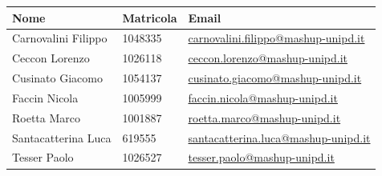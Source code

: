 \documentclass[10pt,a4paper,sans]{moderncv}        %
\begin{document}
	\begin{center}
		\begin{tabularx}{0.8\linewidth}{|X |X |l|}
		\hline
		\hspace*{0.2cm} \textbf{Nome} & \hspace*{0.2cm} \textbf{Matricola} & \hspace*{0.2cm} \textbf{Email} \\ \hline

		\hspace*{0.2cm} Carnovalini Filippo & \hspace*{0.2cm}1048335 & \hspace*{0.2cm}\href{mailto:carnovalini.filippo@mashup-unipd.it}{carnovalini.filippo@mashup-unipd.it} \\ \hline

		\hspace*{0.2cm} Ceccon Lorenzo & \hspace*{0.2cm}1026118 & \hspace*{0.2cm}\href{mailto:ceccon.lorenzo@mashup-unipd.it}{ceccon.lorenzo@mashup-unipd.it} \\ \hline

		\hspace*{0.2cm} Cusinato Giacomo &\hspace*{0.2cm}1054137 & \hspace*{0.2cm}\href{mailto:cusinato.giacomo@mashup-unipd.it}{cusinato.giacomo@mashup-unipd.it} \\ \hline
 
		\hspace*{0.2cm} Faccin Nicola &\hspace*{0.2cm}1005999  & \hspace*{0.2cm}\href{mailto:faccin.nicola@mashup-unipd.it}{faccin.nicola@mashup-unipd.it} \\ \hline

		\hspace*{0.2cm} Roetta Marco & \hspace*{0.2cm}1001887 & \hspace*{0.2cm}\href{mailto:roetta.marco@mashup-unipd.it}{roetta.marco@mashup-unipd.it} \\ \hline

		\hspace*{0.2cm} Santacatterina Luca & \hspace*{0.2cm}619555 & \hspace*{0.2cm}\href{mailto:santacatterina.luca@mashup-unipd.it}{santacatterina.luca@mashup-unipd.it} \\ \hline

		\hspace*{0.2cm} Tesser Paolo & \hspace*{0.2cm}1026527 & \hspace*{0.2cm}\href{mailto:tesser.paolo@mashup-unipd.it}{tesser.paolo@mashup-unipd.it} \\
		\hline
		\end{tabularx}
	\end{center}
\end{document}
